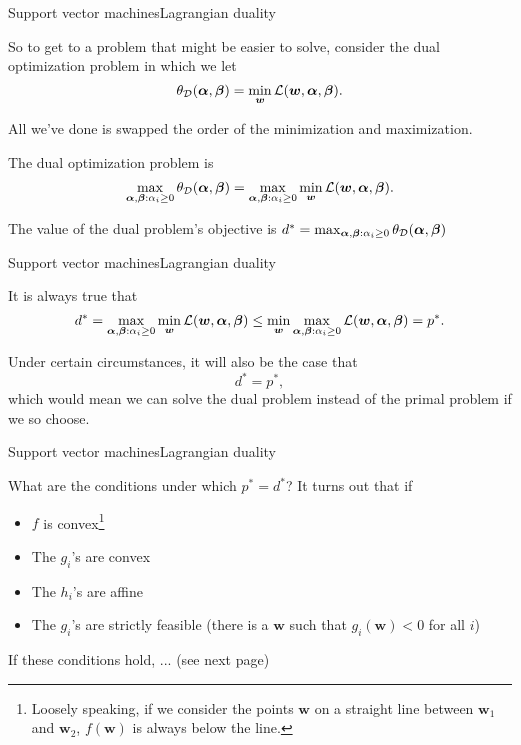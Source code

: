 \documentclass{beamer}
\renewcommand{\vec}[1]{\boldsymbol{#1}}
\begin{document}
\begin{frame}{Support vector machines}{Lagrangian duality}

  So to get to a problem that might be easier to solve,
  consider the \alert{dual} optimization problem in which we let
  \[ \theta_{\cal D}(\vec{\alpha},\vec{\beta}) = \min_{\vec{w}}{\cal L}(\vec{w},\vec{\alpha},\vec{\beta}). \]

  All we've done is swapped the order of the minimization and maximization.

  \medskip

  The \alert{dual optimization problem} is
  \[ \max_{\vec{\alpha},\vec{\beta}:\alpha_i \ge 0} \theta_{\cal D}(\vec{\alpha},\vec{\beta}) = \max_{\vec{\alpha},\vec{\beta}:\alpha_i \ge 0} \min_{\vec{w}} {\cal L}(\vec{w},\vec{\alpha},\vec{\beta}). \]
  
  The \alert{value of the dual problem's objective} is $d^*
  =\max_{\vec{\alpha},\vec{\beta}:\alpha_i \ge 0} \theta_{\cal
    D}(\vec{\alpha},\vec{\beta})$

\end{frame}


\begin{frame}{Support vector machines}{Lagrangian duality}

  It is always true that
  \[ d^* = \max_{\vec{\alpha},\vec{\beta}:\alpha_i \ge 0}\min_{\vec{w}}{\cal L}(\vec{w},\vec{\alpha},\vec{\beta}) \le
  \min_{\vec{w}} \max_{\vec{\alpha},\vec{\beta}:\alpha_i \ge 0} {\cal
    L}(\vec{w},\vec{\alpha},\vec{\beta}) = p^* .\]

  Under certain circumstances, it will also be the case that
  \[ d^* = p^* ,\]
  which would mean we can solve the dual problem instead of the primal
  problem if we so choose.

\end{frame}


\begin{frame}{Support vector machines}{Lagrangian duality}

  What are the conditions under which $p^*=d^*$? It turns out that if
  \begin{itemize}
  \item $f$ is convex\footnote{Loosely speaking, if we consider
    the points $\vec{w}$ on a straight line
    between $\vec{w}_1$ and $\vec{w}_2$, $f(\vec{w})$ is always below
    the line.}
  \item The $g_i$'s are convex
  \item The $h_i$'s are affine
  \item The $g_i$'s are strictly feasible (there is a $\vec{w}$ such that $g_i(\vec{w})<0$ for all $i$)
  \end{itemize}

  \medskip

  If these conditions hold, ... (see next page)

\end{frame}
\end{document}
